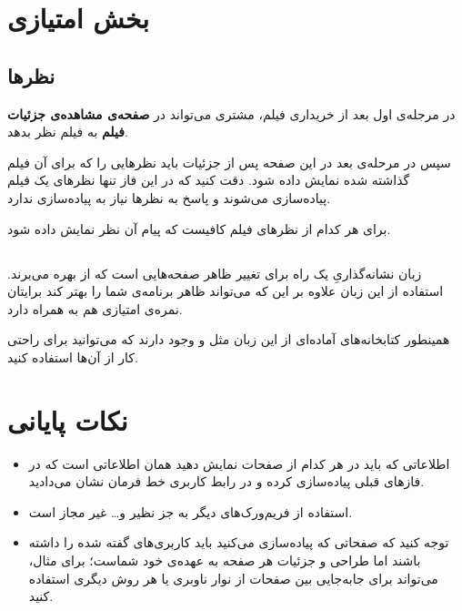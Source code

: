 \documentclass{utap}
\begin{document}
    
    
    
    
    
    \section{بخش امتیازی}
    	\subsection{نظر‌ها}
    	در مرجله‌ی اول بعد از خریداری فیلم، مشتری می‌تواند در  
    	\textbf{صفحه‌ی مشاهده‌ی جزئیات فیلم}
    	به فیلم نظر بدهد. 
    	
    	سپس در مرحله‌ی بعد در این صفحه پس از جزئیات باید نظرهایی را که برای آن فیلم گذاشته شده نمایش داده شود. دقت کنید که در این فاز تنها نظر‌های یک فیلم پیاده‌سازی می‌شوند و پاسخ به نظر‌ها نیاز به پیاده‌سازی ندارد.
    	
    	     برای هر کدام از نظر‌های فیلم کافیست که پیام آن نظر‌ نمایش داده شود.
    	
        \subsection{}
    زبان نشانه‌گذاریِ 
 یک راه برای تغییر ظاهر صفحه‌هایی است که از  بهره می‌برند. استفاده از این زبان علاوه بر این که می‌تواند ظاهر برنامه‌ی شما را بهتر کند برایتان نمره‌ی امتیازی هم به همراه دارد.
 
 همینطور کتابخانه‌های آماده‌ای از این زبان مثل
  و
  وجود دارند که می‌توانید برای راحتی کار از آن‌ها استفاده کنید. 
 
 
 
 
    \section{نکات پایانی}
        \begin{itemize}
            \item  اطلاعاتی که باید در هر کدام از صفحات نمایش دهید همان اطلاعاتی است که در فاز‌های قبلی پیاده‌سازی کرده‌ و در رابط کاربری خط فرمان نشان می‌دادید. 
            \item  
            استفاده از فریم‌ورک‌های دیگر به جز
                نظیر 
                و\dots{} غیر مجاز است.
                
            \item 
            توجه کنید که صفحاتی که پیادەسازی می‌کنید باید کاربری‌های گفته شده را داشته باشند اما طراحی و جزئیات هر صفحه به عهدەی خود شماست؛ برای مثال، می‌تواند برای جابه‌جایی بین صفحات از نوار ناوبری
            یا هر روش دیگری استفاده کنید. 
    	\end{itemize}
\end{document}
